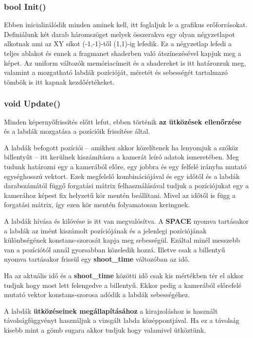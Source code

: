 \subsubsection{bool Init()}

Ebben inicializálódik minden aminek kell, itt foglaljuk le a grafikus erőforrásokat. Definiálunk két darab háromszöget melyek összerakva egy olyan négyzetlapot alkotnak ami az XY síkot (-1,-1)-től (1,1)-ig lefedik. Ez a négyzetlap lefedi a teljes ablakot és ennek a fragmanet shaderben való átszínezésével kapjuk meg a képet. Az uniform változók memóriacímeit és a shadereket is itt határozzuk meg, valamint a mozgatható labdák pozícióját, méretét és sebességét tartalmazó tömbök is itt kapnak kezdőértékeket.

\subsubsection{void Update()}

Minden képernyőfrissítés előtt lefut, ebben történik \textbf{az ütközések ellenőrzése} és a labdák mozgatása a pozícióik frissítése által. 

A labdák befogott pozíciói -- amikhez akkor közelítenek ha lenyomjuk a szóköz billentyűt -- itt kerülnek kiszámításra a kamerát leíró adatok ismeretében. Meg tudunk határozni egy a kamerából előre, egy jobbra és egy felfelé irányba mutató egységhosszú vektort. Ezek megfelelő kombinációjával és egy időtől és a labdák darabszámától függő forgatási mátrix felhasználásával tudjuk a pozíciójukat egy a kamerához képest fix helyzetű kör mentén beállítani. Mivel az időtől is függ a forgatási mátrix, így ezen kör mentén folyamatosan keringnek.

A labdák hívása és kilövése is itt van megvalósítva. A \textbf{SPACE} nyomva tartásakor a labdák az imént kiszámolt pozíciójának és a jelenlegi pozíciójának különbségének konstans-szorosát kapja meg sebességül. Ezáltal minél messzebb van a pozíciótól annál gyorsabban közeledik hozzá. Illetve csak a billentyű nyomva tartásakor frissül egy \textbf{shoot\_time} változóban az idő. 

Ha az aktuális idő és a \textbf{shoot\_time} közötti idő csak kis mértékben tér el akkor tudjuk hogy most lett felengedve a billentyű. Ekkor pedig a kamerából előrefelé mutató vektor konstans-szorosa adódik a labdák sebességéhez.

A labdák \textbf{ütközéseinek megállapításához} a kirajzoláshoz is használt távolságfüggvényt használjuk a vizsgált labda középpontjával. Ha ez a távolság kisebb mint a gömb sugara akkor tudjuk hogy valamivel ütköztünk.

